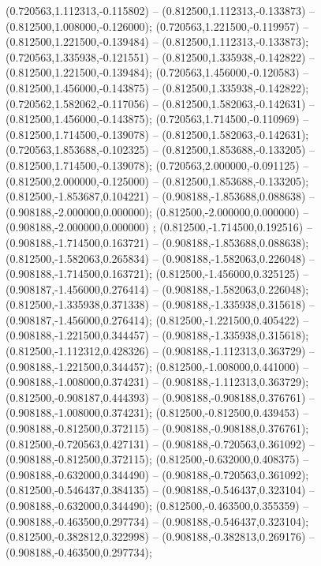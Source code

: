  (0.720563,1.112313,-0.115802) -- (0.812500,1.112313,-0.133873) -- (0.812500,1.008000,-0.126000);
 (0.720563,1.221500,-0.119957) -- (0.812500,1.221500,-0.139484) -- (0.812500,1.112313,-0.133873);
 (0.720563,1.335938,-0.121551) -- (0.812500,1.335938,-0.142822) -- (0.812500,1.221500,-0.139484);
 (0.720563,1.456000,-0.120583) -- (0.812500,1.456000,-0.143875) -- (0.812500,1.335938,-0.142822);
 (0.720562,1.582062,-0.117056) -- (0.812500,1.582063,-0.142631) -- (0.812500,1.456000,-0.143875);
 (0.720563,1.714500,-0.110969) -- (0.812500,1.714500,-0.139078) -- (0.812500,1.582063,-0.142631);
 (0.720563,1.853688,-0.102325) -- (0.812500,1.853688,-0.133205) -- (0.812500,1.714500,-0.139078);
 (0.720563,2.000000,-0.091125) -- (0.812500,2.000000,-0.125000) -- (0.812500,1.853688,-0.133205);
 (0.812500,-1.853687,0.104221) -- (0.908188,-1.853688,0.088638) -- (0.908188,-2.000000,0.000000);
 (0.812500,-2.000000,0.000000) -- (0.908188,-2.000000,0.000000) ;
 (0.812500,-1.714500,0.192516) -- (0.908188,-1.714500,0.163721) -- (0.908188,-1.853688,0.088638);
 (0.812500,-1.582063,0.265834) -- (0.908188,-1.582063,0.226048) -- (0.908188,-1.714500,0.163721);
 (0.812500,-1.456000,0.325125) -- (0.908187,-1.456000,0.276414) -- (0.908188,-1.582063,0.226048);
 (0.812500,-1.335938,0.371338) -- (0.908188,-1.335938,0.315618) -- (0.908187,-1.456000,0.276414);
 (0.812500,-1.221500,0.405422) -- (0.908188,-1.221500,0.344457) -- (0.908188,-1.335938,0.315618);
 (0.812500,-1.112312,0.428326) -- (0.908188,-1.112313,0.363729) -- (0.908188,-1.221500,0.344457);
 (0.812500,-1.008000,0.441000) -- (0.908188,-1.008000,0.374231) -- (0.908188,-1.112313,0.363729);
 (0.812500,-0.908187,0.444393) -- (0.908188,-0.908188,0.376761) -- (0.908188,-1.008000,0.374231);
 (0.812500,-0.812500,0.439453) -- (0.908188,-0.812500,0.372115) -- (0.908188,-0.908188,0.376761);
 (0.812500,-0.720563,0.427131) -- (0.908188,-0.720563,0.361092) -- (0.908188,-0.812500,0.372115);
 (0.812500,-0.632000,0.408375) -- (0.908188,-0.632000,0.344490) -- (0.908188,-0.720563,0.361092);
 (0.812500,-0.546437,0.384135) -- (0.908188,-0.546437,0.323104) -- (0.908188,-0.632000,0.344490);
 (0.812500,-0.463500,0.355359) -- (0.908188,-0.463500,0.297734) -- (0.908188,-0.546437,0.323104);
 (0.812500,-0.382812,0.322998) -- (0.908188,-0.382813,0.269176) -- (0.908188,-0.463500,0.297734);
